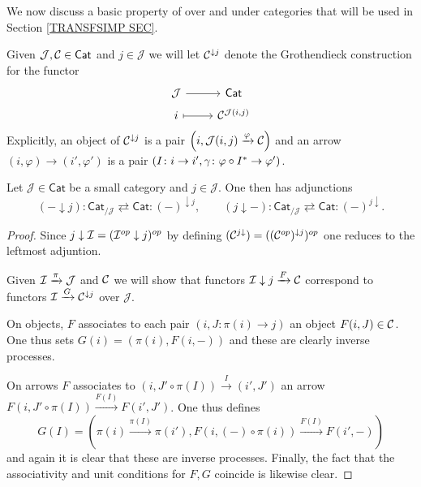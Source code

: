 \documentclass[a4paper,10pt]{article}%
\begin{document}
We now discuss a basic property of over and under categories that will be used in Section \ref{TRANSFSIMP SEC}.


Given $\mathcal{J},\mathcal{C} \in \mathsf{Cat}$ and $j \in \mathcal{J}$ we will let $\mathcal{C}^{ \downarrow j}$ denote the Grothendieck construction for the functor
\[
\begin{tikzcd}[row sep = 0.25em]
	\mathcal{J} \ar{r} & \mathsf{Cat} \\
	i \ar[mapsto]{r} & \C^{\mathcal{J}(i,j)}
\end{tikzcd}
\]
Explicitly, an object of $\mathcal{C}^{\downarrow j}$ is a pair
$\left(i,\mathcal{J}(i,j)\xrightarrow{\varphi} \mathcal{C}\right)$
and an arrow 
$(i,\varphi) \to (i',\varphi')$
is a pair
$(I \colon i \to i', 
\gamma \colon \varphi\circ I^{\**} \to \varphi')$.

	

\begin{lemma}\label{UNDERLEFTADJ LEM}
Let $\mathcal{J} \in \mathsf{Cat}$ be a small category and 
$j \in \mathcal{J}$. One then has adjunctions
\[
	(\minus \downarrow j) 
		\colon
	\mathsf{Cat}_{/\mathcal{J}}
		\rightleftarrows
	\mathsf{Cat}
		\colon
	(\minus)^{\downarrow j},
\qquad
	(j \downarrow \minus) 
		\colon
	\mathsf{Cat}_{/\mathcal{J}}
		\rightleftarrows
	\mathsf{Cat}
		\colon
	(\minus)^{j \downarrow}.
\]
\end{lemma}

\begin{proof}
Since $j \downarrow \mathcal{I} = (\mathcal{I}^{op} \downarrow j)^{op}$ by  defining $(\mathcal{C}^{j \downarrow}) = ((\mathcal{C}^{op})^{\downarrow j})^{op}$ one reduces to the leftmost adjuntion.

	Given $\mathcal{I} \xrightarrow{\pi} \mathcal{J}$ and $\mathcal{C}$ we will show that functors 
	$\mathcal{I} \downarrow j \xrightarrow{F} \mathcal{C}$
correspond to functors
	$\mathcal{I} \xrightarrow{G} \mathcal{C}^{\downarrow j}$ over $\mathcal{J}$.
	
	On objects, $F$ associates to each pair 
	$(i,J\colon \pi(i) \to j)$ an object $F(i,J)\in \mathcal{C}$. One thus sets $G(i)=(\pi(i), F(i,\minus))$ and these are clearly inverse processes.

	On arrows $F$ associates to 
	$(i,J' \circ \pi(I)) \xrightarrow{I} (i',J')$ an arrow
	$F(i,J' \circ \pi(I)) \xrightarrow{F(I)} F(i',J')$.
	One thus defines
\[
	G(I) = \left(
	\pi(i) \xrightarrow{\pi(I)} \pi(i'),
	F\left(i,(\minus)\circ \pi(i)\right)
		\xrightarrow{F(I)}
	F\left(i',\minus \right)
	\right)
\]
and again it is clear that these are inverse processes.
	Finally, the fact that the associativity and unit conditions for $F,G$ coincide is likewise clear.
\end{proof}
\end{document}
